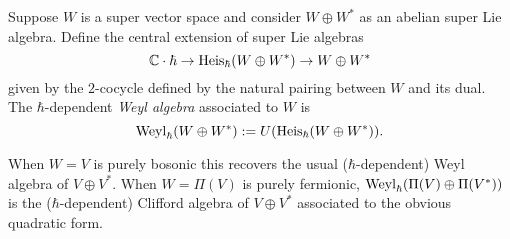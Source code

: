 \begin{dfn}
Suppose $W$ is a super vector space and consider $W \oplus W^*$ as an abelian super Lie algebra. 
Define the central extension of super Lie algebras
\[
\mathbb C \cdot \hbar \to {\rm Heis}_\hbar (W \oplus W^*) \to W \oplus W^*
\]
given by the $2$-cocycle defined by the natural pairing between $W$ and its dual. 
The $\hbar$-dependent {\em Weyl algebra} associated to $W$ is
\[
{\rm Weyl}_\hbar(W \oplus W^*) := U({\rm Heis}_\hbar(W \oplus W^*)) .
\]
\end{dfn}

\begin{rmk}
When $W = V$ is purely bosonic this recovers the usual ($\hbar$-dependent) Weyl algebra of $V \oplus V^*$. 
When $W = \Pi(V)$ is purely fermionic, ${\rm Weyl}_\hbar(\Pi(V) \oplus \Pi(V^*))$ is the ($\hbar$-dependent) Clifford algebra of $V\oplus V^*$ associated to the obvious quadratic form.  
\end{rmk} 

